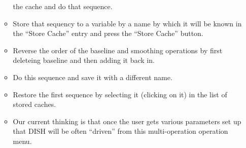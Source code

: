 \begin{itemize}
\begin{itemize}
the cache and do that sequence.
\item Store that sequency to a variable by a name by which it will be known 
in the ``Store Cache'' entry and press the ``Store Cache'' button.
\item Reverse the order of the baseline and smoothing operations by
first deleteing baseline and then adding it back in.
\item Do this sequence and save it with a different name.
\item Restore the first sequence by selecting it (clicking on it) in the
list of stored caches.
\item Our current thinking is that once the user gets various parameters
set up that DISH will be often ``driven'' from this multi-operation
operation menu.
\end{itemize}
\end{itemize}
